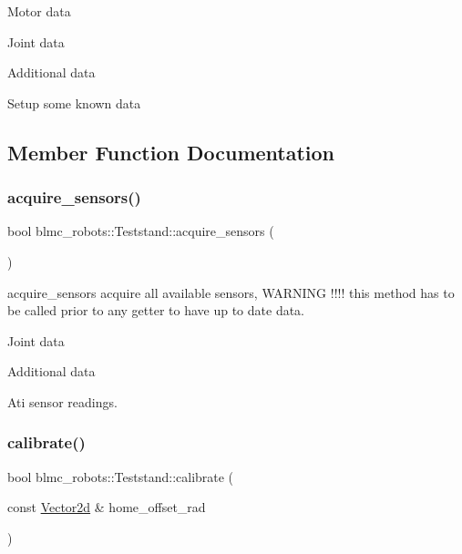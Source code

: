 Motor data

Joint data

Additional data

Setup some known data

\subsection{Member Function Documentation}
\mbox{\label{classblmc__robots_1_1Teststand_a4203e25148ab5b4ddfef3b46647213c6}} 
\subsubsection{\texorpdfstring{acquire\+\_\+sensors()}{acquire\_sensors()}}
{\footnotesize\ttfamily bool blmc\+\_\+robots\+::\+Teststand\+::acquire\+\_\+sensors (\begin{DoxyParamCaption}{ }\end{DoxyParamCaption})}



acquire\+\_\+sensors acquire all available sensors, W\+A\+R\+N\+I\+NG !!!! this method has to be called prior to any getter to have up to date data. 

Joint data

Additional data

Ati sensor readings.\mbox{\label{classblmc__robots_1_1Teststand_ad4660570e3e1b77717004b3ce8056faf}} 
\subsubsection{\texorpdfstring{calibrate()}{calibrate()}}
{\footnotesize\ttfamily bool blmc\+\_\+robots\+::\+Teststand\+::calibrate (\begin{DoxyParamCaption}\item[{const \hyperlink{common__header_8hpp_acb6916bc8c9fe9d98c484fd4cc201447}{Vector2d} \&}]{home\+\_\+offset\+\_\+rad }\end{DoxyParamCaption})}



